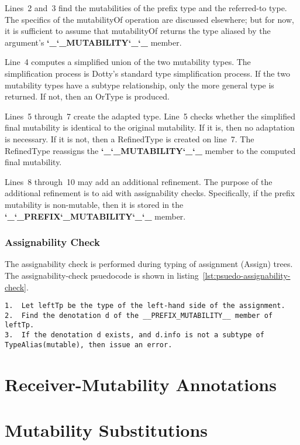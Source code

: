 \documentclass[11pt]{report}
\newcommand{\und}{\char`_}
\newcommand{\MUTABILITY}{\und\und MUTABILITY\und\und }
\newcommand{\PREFIXMUTABILITY}{\und\und PREFIX\und MUTABILITY\und\und }
\newcommand{\cdf}{\bf\ttfamily} %
\newcommand{\cd}{\cdf\small}  %
\begin{document}
Lines~2 and~3 find the mutabilities of the prefix type and the referred-to type. The specifics of the mutabilityOf operation are discussed elsewhere; but for now, it is sufficient to assume that mutabilityOf returns the type aliased by the argument's {\cd \MUTABILITY} member.

Line~4 computes a simplified union of the two mutability types. The simplification process is Dotty's standard type simplification process. If the two mutability types have a subtype relationship, only the more general type is returned. If not, then an OrType is produced.

Lines~5 through~7 create the adapted type. Line~5 checks whether the simplified final mutability is identical to the original mutability. If it is, then no adaptation is necessary. If it is not, then a RefinedType is created on line~7. The RefinedType reassigns the {\cd \MUTABILITY} member to the computed final mutability.

Lines~8 through~10 may add an additional refinement. The purpose of the additional refinement is to aid with assignability checks. Specifically, if the prefix mutability is non-mutable, then it is stored in the {\cd \PREFIXMUTABILITY} member.

\subsubsection{Assignability Check}

The assignability check is performed during typing of assignment (Assign) trees. The assignability-check psuedocode is shown in listing~\ref{lst:psuedo-assignability-check}.

\begin{lstlisting}[float=htbp, caption={Psuedocode for Assignability Checking}, label={lst:psuedo-assignability-check}]
1.  Let leftTp be the type of the left-hand side of the assignment.
2.  Find the denotation d of the __PREFIX_MUTABILITY__ member of leftTp.
3.  If the denotation d exists, and d.info is not a subtype of TypeAlias(mutable), then issue an error.
\end{lstlisting}


\section{Receiver-Mutability Annotations}


\section{Mutability Substitutions} \label{sec:mutability-subst}
\end{document}
